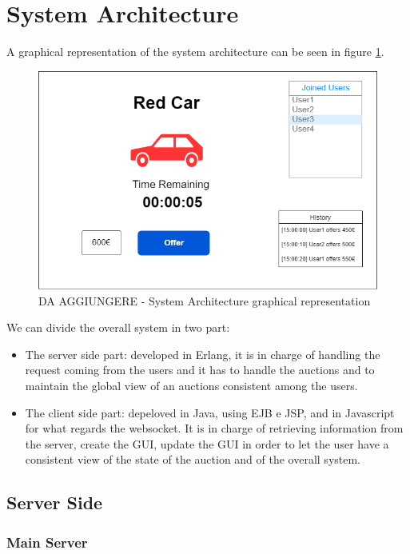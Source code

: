 \section{System Architecture}
\noindent A graphical representation of the system architecture can be seen in figure \ref{fig:architecture}.

\begin{figure}[H]
	\centering
	\includegraphics[width=0.7\linewidth]{img/wireframeDSMT.drawio}
	\caption{DA AGGIUNGERE - System Architecture graphical representation}
	\label{fig:architecture}
\end{figure}

\noindent We can divide the overall system in two part:
\begin{itemize}
	\item The server side part: developed in Erlang, it is in charge of handling the request coming from the users and it has to handle the auctions and to maintain the global view of an auctions consistent among the users.
	
	\item The client side part: depeloved in Java, using EJB e JSP, and in Javascript for what regards the websocket. It is in charge of retrieving information from the server, create the GUI, update the GUI in order to let the user have a consistent view of the state of the auction and of the overall system.
\end{itemize}

\subsection{Server Side}

\subsubsection{Main Server}

